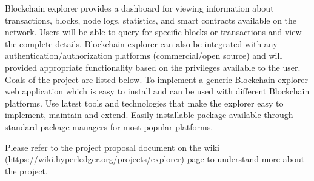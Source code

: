 Blockchain explorer provides a dashboard for viewing information about transactions, blocks, node logs, statistics,  and smart contracts available on the network. Users will be able to query for specific blocks or transactions and view the complete details. Blockchain explorer can also be integrated with any authentication/authorization platforms (commercial/open source) and will provided appropriate functionality based on the privileges available to the user. 
Goals of the project are listed below.
To implement a generic Blockchain explorer web application which is easy to install and can be used with different Blockchain platforms.
Use latest tools and technologies that make the explorer easy to implement, maintain and extend.
Easily installable package available through standard package managers for most popular platforms.

Please refer to the project proposal document on the wiki (\url{https://wiki.hyperledger.org/projects/explorer}) page to understand more about the project.
